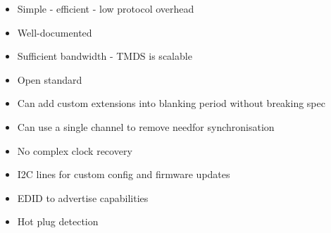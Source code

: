 \begin{itemize}
  \item{Simple - efficient - low protocol overhead}
  \item{Well-documented}
  \item{Sufficient bandwidth - TMDS is scalable}
  \item{Open standard}
  \item{Can add custom extensions into blanking period without breaking spec}
  \item{Can use a single channel to remove needfor synchronisation}
  \item{No complex clock recovery}
  \item{I2C lines for custom config and firmware updates}
  \item{EDID to advertise capabilities}
  \item{Hot plug detection}
\end{itemize}